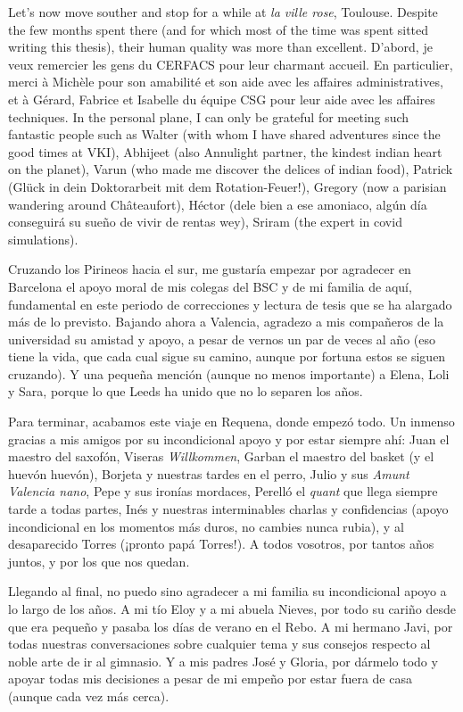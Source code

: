 Let's now move souther and stop for a while at \textsl{la ville rose}, Toulouse. Despite the few months spent there (and for which most of the time was spent sitted writing this thesis), their human quality was more than excellent. D'abord, je veux remercier les gens du CERFACS pour leur charmant accueil. En particulier, merci à Michèle pour son amabilité et son aide avec les affaires administratives, et à Gérard, Fabrice et Isabelle du équipe CSG pour leur aide avec les affaires techniques. In the personal plane, I can only be grateful for meeting such fantastic people such as Walter (with whom I have shared adventures since the good times at VKI), Abhijeet (also Annulight partner, the kindest indian heart on the planet), Varun (who made me discover the delices of indian food), Patrick (Glück in dein Doktorarbeit mit dem Rotation-Feuer!), Gregory (now a parisian wandering around Châteaufort), Héctor (dele bien a ese amoniaco, algún día conseguirá su sueño de vivir de rentas wey), Sriram (the expert in covid simulations).

Cruzando los Pirineos hacia el sur, me gustaría empezar por agradecer en Barcelona el apoyo moral de mis colegas del BSC y de mi familia de aquí, fundamental en este periodo de correcciones y lectura de tesis que se ha alargado más de lo previsto. Bajando ahora a Valencia, agradezo a mis compañeros de la universidad su amistad y apoyo, a pesar de vernos un par de veces al año (eso tiene la vida, que cada cual sigue su camino, aunque por fortuna estos se siguen cruzando). Y una pequeña mención (aunque no menos importante) a Elena, Loli y Sara, porque lo que Leeds ha unido que no lo separen los años. 

Para terminar, acabamos este viaje en Requena, donde empezó todo. Un inmenso gracias a mis amigos por su incondicional apoyo y por estar siempre ahí: Juan el maestro del saxofón, Viseras \textsl{Willkommen}, Garban el maestro del basket (y el huevón huevón), Borjeta y nuestras tardes en el perro, Julio y sus \textsl{Amunt Valencia nano}, Pepe y sus ironías mordaces, Perelló el \textsl{quant} que llega siempre tarde a todas partes, Inés y nuestras interminables charlas y confidencias (apoyo incondicional en los momentos más duros, no cambies nunca rubia), y al desaparecido Torres (¡pronto papá Torres!). A todos vosotros, por tantos años juntos, y por los que nos quedan.

Llegando al final, no puedo sino agradecer a mi familia su incondicional apoyo a lo largo de los años. A mi tío Eloy y a mi abuela Nieves, por todo su cariño desde que era pequeño y pasaba los días de verano en el Rebo. A mi hermano Javi, por todas nuestras conversaciones sobre cualquier tema y sus consejos respecto al noble arte de ir al gimnasio. Y a mis padres José y Gloria, por dármelo todo y apoyar todas mis decisiones a pesar de mi empeño por estar fuera de casa (aunque cada vez más cerca).

